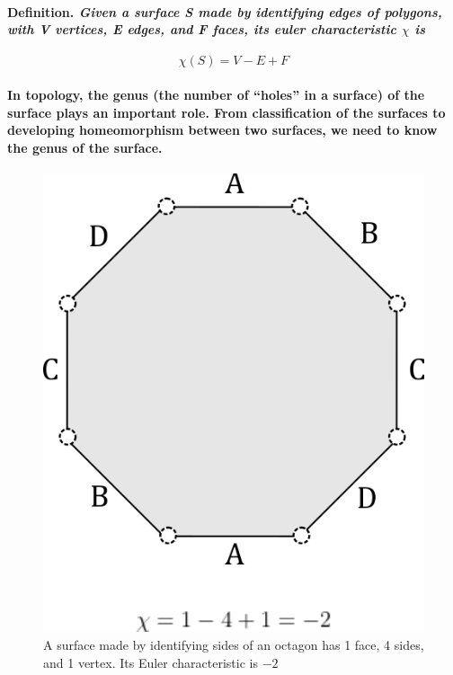 \documentclass{report}
\begin{document}
\paragraph{\textbf{Definition.} \textit{Given a surface \textit{S} made by identifying edges of polygons, with \textit{V} vertices, \textit{E} edges, and \textit{F} faces, its euler characteristic $\chi$ is}}

\begin{equation}
\mathit{\chi(S)=V-E+F}
\end{equation}

\paragraph{In topology, the genus (the number of “holes” in a surface) of the surface plays an important role. From classification of the surfaces to developing homeomorphism between two surfaces, we need to know the genus of the surface.\\}

\begin{figure}[h]
\begin{center}
\includegraphics[scale=0.25]{euca}
\caption{A surface made by identifying sides of an octagon has 1 face, 4 sides, and 1 vertex. Its Euler characteristic is $-2$}
\end{center}
\end{figure}
\end{document}
